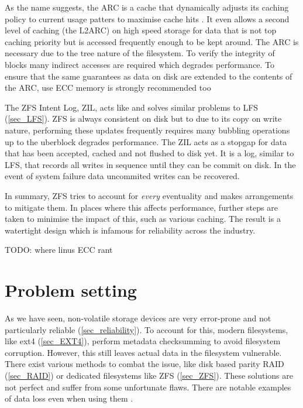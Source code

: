             As the name suggests, the ARC is a cache that dynamically adjusts
            its caching policy to current usage patters to maximise cache hits
            \cite{ARC}. It even allows a second level of caching (the L2ARC) on
            high speed storage for data that is not top caching priority but is
            accessed frequently enough to be kept around. The ARC is necessary
            due to the tree nature of the filesystem. To verify the integrity
            of blocks many indirect accesses are required which degrades
            performance. To ensure that the same guarantees as data on disk are
            extended to the contents of the ARC, use ECC memory is strongly
            recommended too

            The ZFS Intent Log, ZIL, acts like and solves similar problems to
            LFS (\ref{sec_LFS}). ZFS is always consistent on disk but to due to
            its copy on write nature, performing these updates frequently
            requires many bubbling operations up to the uberblock degrades
            performance.  The ZIL acts as a stopgap for data that has been
            accepted, cached and not flushed to disk yet. It is a log, similar
            to LFS, that records all writes in sequence until they can be
            commit on disk. In the event of system failure data uncommited
            writes can be recovered.

            In summary, ZFS tries to account for \textit{every} eventuality and
            makes arrangements to mitigate them. In places where this affects
            performance, further steps are taken to minimise the impact of
            this, such as various caching. The result is a watertight design
            which is infamous for reliability across the industry.

TODO: where linus ECC rant

\chapter{Problem setting}

    As we have seen, non-volatile storage devices are very error-prone and not
    particularly reliable (\ref{sec_reliability}). To account for this, modern
    filesystems, like ext4 (\ref{sec_EXT4}), perform metadata checksumming to
    avoid filesystem corruption. However, this still leaves actual data in the
    filesystem vulnerable. There exist various methods to combat the issue,
    like disk based parity RAID (\ref{sec_RAID}) or dedicated filesystems like
    ZFS (\ref{sec_ZFS}). These solutions are not perfect and suffer from some
    unfortunate flaws. There are notable examples of data loss even when using
    them \cite{LTT_data_loss}.

